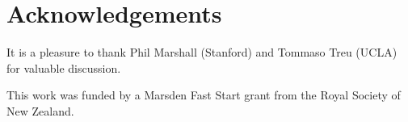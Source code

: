 \documentclass[useAMS,usenatbib]{mn2e}
\begin{document}
% 


%  
%  




\section*{Acknowledgements}
It is a pleasure to thank Phil Marshall (Stanford) and Tommaso Treu (UCLA)
for valuable discussion.

This work was funded by a Marsden Fast Start grant from the Royal Society of
New Zealand.
\end{document}
